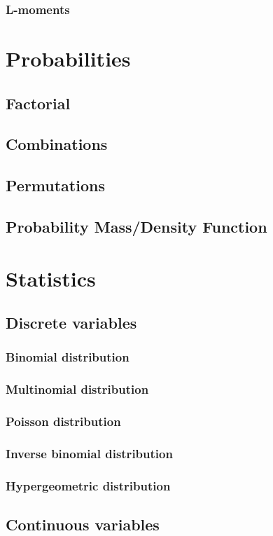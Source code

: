\documentclass{report}
\begin{document}
		\subsection{L-moments}

\chapter{Probabilities}
	\section{Factorial}
	\section{Combinations}
	\section{Permutations}
	\section{Probability Mass/Density Function}

\chapter{Statistics}
	\section{Discrete variables}
		\subsection{Binomial distribution}
		\subsection{Multinomial distribution}
		\subsection{Poisson distribution}
		\subsection{Inverse binomial distribution}
		\subsection{Hypergeometric distribution}
	\section{Continuous variables}
\end{document}
